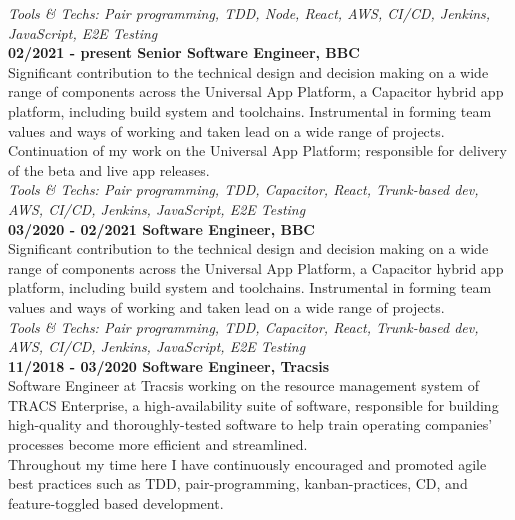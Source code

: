\bigskip

\emph{Tools \& Techs: Pair programming, TDD, Node, React, AWS, CI/CD, Jenkins, JavaScript, E2E Testing}\\

\textbf{02/2021 - present \hspace{2.75em}Senior Software Engineer, BBC}\\

Significant contribution to the technical design and decision making on a wide range of components across the Universal App Platform, a Capacitor hybrid app platform, including build system and toolchains. Instrumental in forming team values and ways of working and taken lead on a wide range of projects.\\

Continuation of my work on the Universal App Platform; responsible for delivery of the beta and live app releases.\\

\emph{Tools \& Techs: Pair programming, TDD, Capacitor, React, Trunk-based dev, AWS, CI/CD, Jenkins, JavaScript, E2E Testing}\\

\textbf{03/2020 - 02/2021 \hspace{2.75em}Software Engineer, BBC}\\

Significant contribution to the technical design and decision making on a wide range of components across the Universal App Platform, a Capacitor hybrid app platform, including build system and toolchains. Instrumental in forming team values and ways of working and taken lead on a wide range of projects.\\

\emph{Tools \& Techs: Pair programming, TDD, Capacitor, React, Trunk-based dev, AWS, CI/CD, Jenkins, JavaScript, E2E Testing}\\

\textbf{11/2018 - 03/2020 \hspace{2.75em}Software Engineer, Tracsis}\\

Software Engineer at Tracsis working on the resource management system of TRACS Enterprise, a high-availability suite of software, responsible for building high-quality and thoroughly-tested software to help train operating companies' processes become more efficient and streamlined.\\

Throughout my time here I have continuously encouraged and promoted agile best practices such as TDD, pair-programming, kanban-practices, CD, and feature-toggled based development.\\

